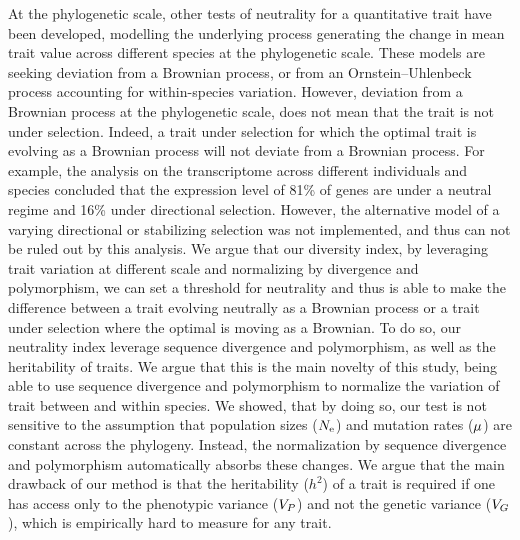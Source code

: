\documentclass{article}
\begin{document}
At the phylogenetic scale, other tests of neutrality for a quantitative trait have been developed, modelling the underlying process generating the change in mean trait value across different species at the phylogenetic scale\cite{fay_evaluating_2008}.
These models are seeking deviation from a Brownian process\cite{catalan_drift_2019}, or from an Ornstein–Uhlenbeck process accounting for within-species variation\cite{rohlfs_phylogenetic_2015}.
However, deviation from a Brownian process at the phylogenetic scale, does not mean that the
trait is not under selection.
Indeed, a trait under selection for which the optimal trait is evolving as a Brownian process will not deviate from a Brownian process\cite{hansen_translating_1996}.
For example, the analysis on the transcriptome across different individuals and species concluded that the expression level of 81\% of genes are under a neutral regime and 16\% under directional selection\cite{catalan_drift_2019}.
However, the alternative model of a varying directional or stabilizing selection was not implemented, and thus can not be ruled out by this analysis.
We argue that our diversity index, by leveraging trait variation at different scale and normalizing by divergence and polymorphism, we can set a threshold for neutrality and thus is able to make the difference between a trait evolving neutrally as a Brownian process or a trait under selection where the optimal is moving as a Brownian.
To do so, our neutrality index leverage sequence divergence and polymorphism, as well as the heritability of traits.
We argue that this is the main novelty of this study, being able to use sequence divergence and polymorphism to normalize the variation of trait between and within species.
We showed, that by doing so, our test is not sensitive to the assumption that population sizes ($N_{\text{e}}$) and mutation rates ($\mu$) are constant across the phylogeny.
Instead, the normalization by sequence divergence and polymorphism automatically absorbs these changes\cite{seo_estimating_2004}.
We argue that the main drawback of our method is that the heritability ($h^2$) of a trait is required if one has access only to the phenotypic variance ($V_{P}$) and not the genetic variance ($V_{G}$), which is empirically hard to measure for any trait.
\end{document}
